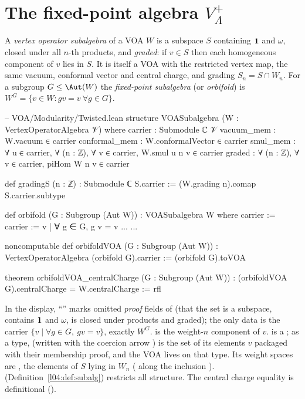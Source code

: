 \section{The fixed-point algebra \texorpdfstring{$V_\Lambda^+$}{V+}}\label{ch04:sec:plus}

\begin{definition}\label{ch04:def:orbifold}
A \emph{vertex operator subalgebra} of a VOA $W$ is a subspace $S$ containing $\mathbf{1}$ and
$\omega$, closed under all $n$-th products, and \emph{graded}: if $v\in S$ then each homogeneous
component of $v$ lies in $S$. It is itself a VOA with the restricted vertex map, the same vacuum,
conformal vector and central charge, and grading $S_n=S\cap W_n$. For a subgroup
$G\le\Aut(W)$ the \emph{fixed-point subalgebra} (or \emph{orbifold}) is
$W^G=\{v\in W: gv=v\ \forall g\in G\}$.
\end{definition}

\begin{leancode}
-- VOA/Modularity/Twisted.lean
structure VOASubalgebra (W : VertexOperatorAlgebra 𝒱) where
  carrier : Submodule ℂ 𝒱
  vacuum_mem : W.vacuum ∈ carrier
  conformal_mem : W.conformalVector ∈ carrier
  smul_mem : ∀ u ∈ carrier, ∀ (n : ℤ), ∀ v ∈ carrier, W.smul u n v ∈ carrier
  graded : ∀ (n : ℤ), ∀ v ∈ carrier, piHom W n v ∈ carrier

def gradingS (n : ℤ) : Submodule ℂ S.carrier := (W.grading n).comap S.carrier.subtype

def orbifold (G : Subgroup (Aut W)) : VOASubalgebra W where
  carrier :=
    { carrier := {v | ∀ g ∈ G, g v = v}
      ... }
  ...

noncomputable def orbifoldVOA (G : Subgroup (Aut W)) :
    VertexOperatorAlgebra (orbifold G).carrier :=
  (orbifold G).toVOA

theorem orbifoldVOA_centralCharge (G : Subgroup (Aut W)) :
    (orbifoldVOA G).centralCharge = W.centralCharge := rfl
\end{leancode}

\begin{dictionary}
In the display, ``'' marks omitted \emph{proof} fields of  (that the set
is a subspace, contains $\mathbf{1}$ and $\omega$, is closed under products and graded); the only data
is the carrier $\{v\mid\forall g\in G,\ gv=v\}$, exactly $W^G$.  is the
weight-$n$ component of $v$.  is a ; as a type,
 (written with the coercion arrow ) is the set of its elements
$v$ packaged with their membership proof, and the VOA  lives on that type. Its
weight spaces are , the elements of $S$ lying in $W_n$ ( along the
inclusion ).  (Definition~\ref{l04:def:subalg}) restricts all structure. The central
charge equality is definitional ().
\end{dictionary}

